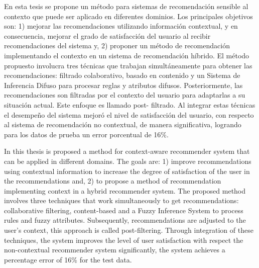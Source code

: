 En esta tesis se propone un m\'etodo para sistemas de recomendaci\'on
sensible al contexto que puede ser aplicado en diferentes dominios.
Los principales objetivos son: 1) mejorar las
recomendaciones utilizando informaci\'on contextual, y en consecuencia,
mejorar el grado de satisfacci\'on del usuario al recibir
recomendaciones del sistema y, 2) proponer un m\'etodo de
recomendaci\'on implementando el contexto en un sistema de recomendaci\'on
h\'ibrido. El m\'etodo propuesto involucra tres t\'ecnicas que trabajan
simult\'aneamente para obtener las recomendaciones: filtrado
colaborativo, basado en contenido  y un Sistema de Inferencia Difuso
para procesar reglas y atributos difusos. Posteriormente, las
recomendaciones son filtradas por el contexto del usuario para
adaptarlas a su situaci\'on actual. Este enfoque es llamado post-
filtrado. Al integrar estas t\'ecnicas el desempeño del sistema mejor\'o
el nivel de satisfacci\'on del usuario, con respecto al sistema de
recomendaci\'on no contextual, de manera significativa,
logrando para los datos de prueba un error porcentual de 16\%.




In this thesis is proposed a method for context-aware recommender
system that can be applied in different domains. The goals are: 1)
improve recommendations using contextual information to increase the
degree of satisfaction of the user in the recommendations and, 2) to
propose a method of recommendation implementing context in a hybrid
recommender system. The proposed method involves three techniques that
work simultaneously to get recommendations: collaborative filtering,
content-based and a Fuzzy Inference System to process rules and fuzzy
attributes. Subsequently, recommendations are adjusted to the user's
context, this approach is called post-filtering. Through integration of
these techniques, the system improves the level of user satisfaction
with respect  the non-contextual recommender system significantly, 
the system achieves a percentage error of 16\% for the test data.


